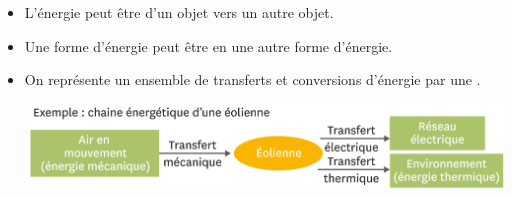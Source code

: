 \begin{mybilan}
	\begin{itemize}
		\item L'énergie peut être  d'un objet vers un autre objet.
		
		\item Une forme d'énergie peut être  en une autre forme d'énergie.
		
		\item On représente un ensemble de transferts et conversions d'énergie par une .

		\begin{center}
			\includegraphics[scale=0.5]{./img/chaine}
		\end{center}
	\end{itemize}
\end{mybilan}

